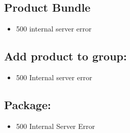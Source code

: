 \documentclass[12pt,a4paper]{article}
\begin{document}
\subsection{Product Bundle}
\begin{itemize}
    \item 500 internal server error
\end{itemize}

\subsection{Add product to group:}
\begin{itemize}
    \item 500 Internal server error
\end{itemize}

\subsection{Package:}
\begin{itemize}
    \item  500 Internal Server Error
\end{itemize}
\end{document}
